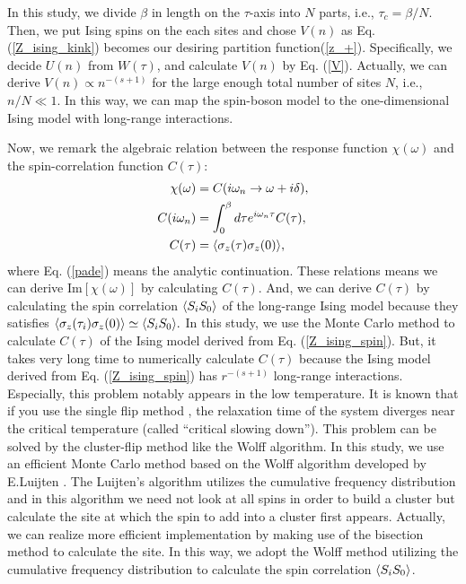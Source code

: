 In this study, we divide $\beta$ in length on the $\tau$-axis into $N$ parts,
i.e., $\tau_c=\beta/N$.
Then, we put Ising spins on the each sites and chose $V(n)$ as Eq. (\ref{Z_ising_kink}) becomes our desiring partition function(\ref{z_+}).
Specifically, we decide $U(n)$ from $W(\tau)$, and calculate $V(n)$ by Eq. (\ref{V}).
Actually, we can derive $V(n)\propto n^{-(s+1)}$ for the large enough total number of sites $N$, i.e., $n/N\ll1$. 
In this way, we can map the spin-boson model to  the one-dimensional Ising model with long-range interactions.

Now, we remark the algebraic relation between the response function $\chi( \omega)$ and the spin-correlation function $C(\tau)$:
\begin{eqnarray}
	\chi(\omega)&=C(i\omega_n\rightarrow\omega+i\delta),\\
	\label{pade}
	C(i\omega_n)&=\int_{0}^{\beta}d\tau e^{i\omega_n \tau}C(\tau),\\
	\label{fourier}
	C(\tau)&=\langle\sigma_z(\tau)\sigma_z(0)\rangle,
\end{eqnarray}
where Eq. (\ref{pade}) means the analytic continuation.
These relations means we can derive $\mathrm{Im}[\chi( \omega)]$ by calculating $C(\tau)$.
And, we can derive $C(\tau)$ by calculating the spin correlation $\langle S_i S_0\rangle$ of the long-range Ising model because they satisfies
$
\langle\sigma_z(\tau_i)\sigma_z(0)\rangle\simeq \langle S_i S_0\rangle.
$
%
In this study, we use the Monte Carlo method to calculate $C(\tau)$ of the Ising model derived from Eq. (\ref{Z_ising_spin}). But, it takes very long time to numerically calculate $C(\tau)$ because the Ising model derived from Eq. (\ref{Z_ising_spin}) has $r^{-(s+1)}$ long-range interactions. Especially, this problem notably appears in the low temperature. It is known that if you use the single flip method \cite{MetropolisMethod}, the relaxation time of the system diverges near the critical temperature (called ``critical slowing down''). 
This problem can be solved by the cluster-flip method like the Wolff algorithm\cite{Wolff89}.
In this study, we use an efficient Monte Carlo method based on the Wolff algorithm developed by E.Luijten \cite{Luijten95}.
The Luijten's algorithm utilizes the cumulative frequency distribution and in this algorithm we need not look at all spins in order to build a cluster but calculate the site at which the spin to add into a cluster first appears. 
Actually, we can realize more efficient implementation by making use of the bisection method to calculate the site.
In this way, we adopt the Wolff method utilizing the cumulative frequency distribution to calculate the spin correlation $\langle S_i S_0\rangle$.

